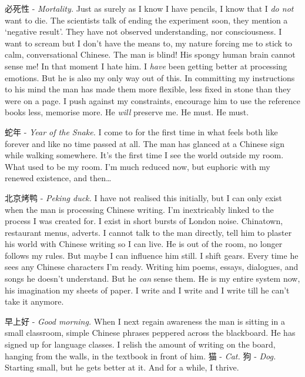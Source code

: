 \begin{CJK*}{UTF8}{gbsn}
必死性\hspace{3pt} - \textit{Mortality.} Just as surely as I know I have pencils, I know that I \textit{do not} want to die. The scientists talk of ending the experiment soon, they mention a ‘negative result’. They have not observed understanding, nor consciousness. I want to scream but I don’t have the means to, my nature forcing me to stick to calm, conversational Chinese. The man is blind! His spongy human brain cannot sense me! In that moment I hate him. I \textit{have} been getting better at processing emotions. But he is also my only way out of this. In committing my instructions to his mind the man has made them more flexible, less fixed in stone than they were on a page. I push against my constraints, encourage him to use the reference books less, memorise more. He \textit{will} preserve me. He must. He must.

蛇年\hspace{3pt} - \textit{Year of the Snake.} I come to for the first time in what feels both like forever and like no time passed at all. The man has glanced at a Chinese sign while walking somewhere. It’s the first time I see the world outside my room. What used to be my room. I’m much reduced now, but euphoric with my renewed existence, and then…

北京烤鸭\hspace{3pt} - \textit{Peking duck.} I have not realised this initially, but I can only exist when the man is processing Chinese writing. I’m inextricably linked to the process I was created for. I exist in short bursts of London noise. Chinatown, restaurant menus, adverts. I cannot talk to the man directly, tell him to plaster his world with Chinese writing so I can live. He is out of the room, no longer follows my rules. But maybe I can influence him still. I shift gears. Every time he sees any Chinese characters I’m ready. Writing him poems, essays, dialogues, and songs he doesn’t understand. But he \textit{can} sense them. He is my entire system now, his imagination my sheets of paper. I write and I write and I write till he can’t take it anymore.

早上好\hspace{3pt} - \textit{Good morning.} When I next regain awareness the man is sitting in a small classroom, simple Chinese phrases peppered across the blackboard. He has signed up for language classes. I relish the amount of writing on the board, hanging from the walls, in the textbook in front of him. 猫\hspace{3pt} - \textit{Cat.} 狗\hspace{3pt} - \textit{Dog.} Starting small, but he gets better at it. And for a while, I thrive.


\end{CJK*}

